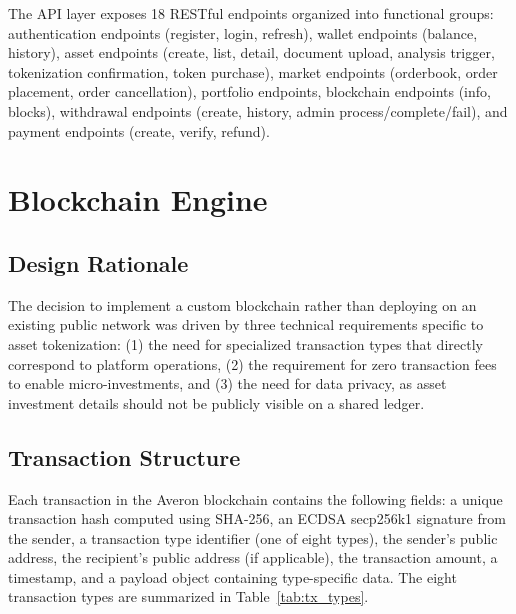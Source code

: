 \documentclass[conference]{IEEEtran}
\begin{document}
The API layer exposes 18 RESTful endpoints organized into functional groups: authentication endpoints (register, login, refresh), wallet endpoints (balance, history), asset endpoints (create, list, detail, document upload, analysis trigger, tokenization confirmation, token purchase), market endpoints (orderbook, order placement, order cancellation), portfolio endpoints, blockchain endpoints (info, blocks), withdrawal endpoints (create, history, admin process/complete/fail), and payment endpoints (create, verify, refund).

\section{Blockchain Engine}
\label{sec:blockchain}

\subsection{Design Rationale}

The decision to implement a custom blockchain rather than deploying on an existing public network was driven by three technical requirements specific to asset tokenization: (1) the need for specialized transaction types that directly correspond to platform operations, (2) the requirement for zero transaction fees to enable micro-investments, and (3) the need for data privacy, as asset investment details should not be publicly visible on a shared ledger.

\subsection{Transaction Structure}

Each transaction in the Averon blockchain contains the following fields: a unique transaction hash computed using SHA-256, an ECDSA secp256k1 signature from the sender, a transaction type identifier (one of eight types), the sender's public address, the recipient's public address (if applicable), the transaction amount, a timestamp, and a payload object containing type-specific data. The eight transaction types are summarized in Table~\ref{tab:tx_types}.
\end{document}
